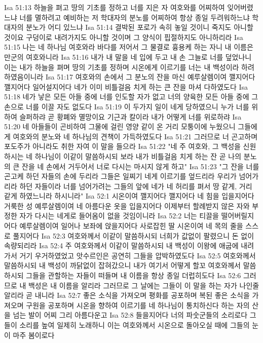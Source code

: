 Isa 51:13  하늘을 펴고 땅의 기초를 정하고 너를 지은 자 여호와를 어찌하여 잊어버렸느냐 너를 멸하려고 예비하는 저 학대자의 분노를 어찌하여 항상 종일 두려워하느냐 학대자의 분노가 어디 있느냐
Isa 51:14  결박된 포로가 속히 놓일 것이니 죽지도 아니할 것이요 구덩이로 내려가지도 아니할 것이며 그 양식이 핍절하지도 아니하리라
Isa 51:15  나는 네 하나님 여호와라 바다를 저어서 그 물결로 흉용케 하는 자니 내 이름은 만군의 여호와니라
Isa 51:16  내가 내 말을 네 입에 두고 내 손 그늘로 너를 덮었나니 이는 내가 하늘을 펴며 땅의 기초를 정하며 시온에게 이르기를 너는 내 백성이라 하려 하였음이니라
Isa 51:17  여호와의 손에서 그 분노의 잔을 마신 예루살렘이여 깰지어다 깰지어다 일어설지어다 네가 이미 비틀걸음 치게 하는 큰 잔을 마셔 다하였도다
Isa 51:18  네가 낳은 모든 아들 중에 너를 인도할 자가 없고 너의 양육한 모든 아들 중에 그 손으로 너를 이끌 자도 없도다
Isa 51:19  이 두가지 일이 네게 당하였으니 누가 너를 위하여 슬퍼하랴 곧 황폐와 멸망이요 기근과 칼이라 내가 어떻게 너를 위로하랴
Isa 51:20  네 아들들이 곤비하여 그물에 걸린 영양 같이 온 거리 모퉁이에 누웠으니 그들에게 여호와의 분노와 네 하나님의 견책이 가득하였도다
Isa 51:21  그러므로 너 곤고하며 포도주가 아니라도 취한 자여 이 말을 들으라
Isa 51:22  "네 주 여호와, 그 백성을 신원하시는 네 하나님이 이같이 말씀하시되 보라 내가 비틀걸음 치게 하는 잔 곧 나의 분노의 큰 잔을 네 손에서 거두어서 너로 다시는 마시지 않게 하고"
Isa 51:23  "그 잔을 너를 곤고케 하던 자들의 손에 두리라 그들은 일찌기 네게 이르기를 엎드리라 우리가 넘어가리라 하던 자들이라 너를 넘어가려는 그들의 앞에 네가 네 허리를 펴서 땅 같게, 거리 같게 하였느니라 하시니라"
Isa 52:1  시온이여 깰지어다 깰지어다 네 힘을 입을지어다 거룩한 성 예루살렘이여 네 아름다운 옷을 입을지어다 이제부터 할례받지 않은 자와 부정한 자가 다시는 네게로 들어옴이 없을 것임이니라
Isa 52:2  너는 티끌을 떨어버릴지어다 예루살렘이여 일어나 보좌에 앉을지어다 사로잡힌 딸 시온이여 네 목의 줄을 스스로 풀지어다
Isa 52:3  여호와께서 이같이 말씀하시되 너희가 값없이 팔렸으니 돈 없이 속량되리라
Isa 52:4  주 여호와께서 이같이 말씀하시되 내 백성이 이왕에 애굽에 내려가서 거기 우거하였었고 앗수르인은 공연히 그들을 압박하였도다
Isa 52:5  여호와께서 말씀하시되 내 백성이 까닭없이 잡혀갔으니 내가 여기서 어떻게 할꼬 여호와께서 말씀하시되 그들을 관할하는 자들이 떠들며 내 이름을 항상 종일 더럽히도다
Isa 52:6  그러므로 내 백성은 내 이름을 알리라 그러므로 그 날에는 그들이 이 말을 하는 자가 나인줄 알리라 곧 내니라
Isa 52:7  좋은 소식을 가져오며 평화를 공포하며 복된 좋은 소식을 가져오며 구원을 공포하며 시온을 향하여 이르기를 네 하나님이 통치하신다 하는 자의 산을 넘는 발이 어찌 그리 아름다운고
Isa 52:8  들을지어다 너의 파숫군들의 소리로다 그들이 소리를 높여 일제히 노래하니 이는 여호와께서 시온으로 돌아오실 때에 그들의 눈이 마주 봄이로다
